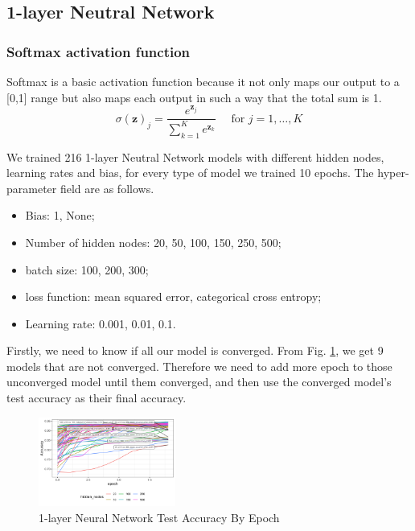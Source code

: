 \documentclass[conference]{IEEEtran}
\begin{document}
\subsection{1-layer Neutral Network}
\subsubsection{Softmax activation function}\label{Softmax activation function}
Softmax is a basic activation function because it not only maps our output to a [0,1] range but also maps each output in such a way that the total sum is 1\cite{hastie2009elements}.
$$
\sigma(\mathbf{z})_{j}=\frac{e^{\mathbf{z}_{j}}}{\sum_{k=1}^{K} e^{\mathbf{z}_{k}}} \quad \text { for } j=1, \ldots, K
$$

We trained 216 1-layer Neutral Network models with different hidden nodes, learning rates and bias, for every type of model we trained 10 epochs. The hyper-parameter field are as follows.
\begin{itemize}
  \item Bias: 1, None;
  \item Number of hidden nodes: 20, 50, 100, 150, 250, 500;
  \item batch size: 100, 200, 300;
  \item loss function: mean squared error, categorical cross entropy;
  \item Learning rate: 0.001, 0.01, 0.1.
\end{itemize}

Firstly, we need to know if all our model is converged. From Fig. \ref{1-layer Neural Network Test Accuracy By Epoch}, we get 9 models that are not converged. Therefore we need to add more epoch to those unconverged model until them converged, and then use the converged model's test accuracy as their final accuracy. 
\begin{figure}[htbp]
\centerline{\includegraphics[width=0.4\textwidth]{figure/1-layer Neural Network Test Accuracy By Epoch.png}}
\caption{1-layer Neural Network Test Accuracy By Epoch}
\label{1-layer Neural Network Test Accuracy By Epoch}
\end{figure}
\end{document}
